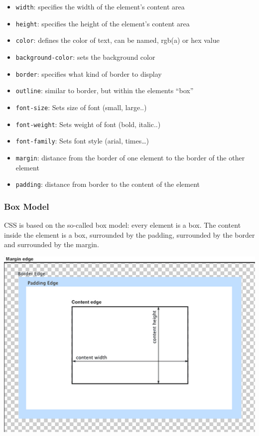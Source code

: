 \documentclass[
]{article}
\providecommand{\tightlist}{%
  \setlength{\itemsep}{0pt}\setlength{\parskip}{0pt}}
\begin{document}
\begin{itemize}
\tightlist
\item
  \texttt{width}: specifies the width of the element's content area\\
\item
  \texttt{height}: specifies the height of the element's content area\\
\item
  \texttt{color}: defines the color of text, can be named, rgb(a) or hex value\\
\item
  \texttt{background-color}: sets the background color\\
\item
  \texttt{border}: specifies what kind of border to display\\
\item
  \texttt{outline}: similar to border, but within the elements ``box''\\
\item
  \texttt{font-size}: Sets size of font (small, large..)\\
\item
  \texttt{font-weight}: Sets weight of font (bold, italic..)\\
\item
  \texttt{font-family}: Sets font style (arial, times\ldots)\\
\item
  \texttt{margin}: distance from the border of one element to the border of the other element\\
\item
  \texttt{padding}: distance from border to the content of the element
\end{itemize}

\hypertarget{box-model}{%
\subsubsection*{Box Model}\label{box-model}}

CSS is based on the so-called box model: every element is a box. The content inside the element is a box, surrounded by the padding, surrounded by the border and surrounded by the margin.

\includegraphics{docs/assets/box-model.png}
\end{document}

